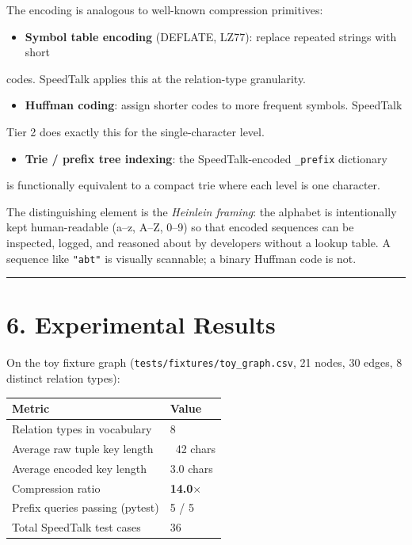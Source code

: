 The encoding is analogous to well-known compression primitives:

\begin{itemize}
  \item \textbf{Symbol table encoding} (DEFLATE, LZ77): replace repeated strings with short
\end{itemize}

codes.  SpeedTalk applies this at the relation-type granularity.
\begin{itemize}
  \item \textbf{Huffman coding}: assign shorter codes to more frequent symbols.  SpeedTalk
\end{itemize}

Tier 2 does exactly this for the single-character level.
\begin{itemize}
  \item \textbf{Trie / prefix tree indexing}: the SpeedTalk-encoded \texttt{\_prefix} dictionary
\end{itemize}

is functionally equivalent to a compact trie where each level is one character.

The distinguishing element is the \textit{Heinlein framing}: the alphabet is intentionally
kept human-readable (a--z, A--Z, 0--9) so that encoded sequences can be inspected,
logged, and reasoned about by developers without a lookup table.  A sequence like
\texttt{"abt"} is visually scannable; a binary Huffman code is not.

\medskip\noindent\rule{\linewidth}{0.4pt}\medskip

\section*{6. Experimental Results}

On the toy fixture graph (\texttt{tests/fixtures/toy\_graph.csv}, 21 nodes, 30 edges,
8 distinct relation types):

\begin{table}[h]
\small\centering
\begin{tabular}{ll}
\toprule
Metric & Value \\
\midrule
Relation types in vocabulary & 8 \\
Average raw tuple key length & ~42 chars \\
Average encoded key length & 3.0 chars \\
Compression ratio & \textbf{14.0$\times$} \\
Prefix queries passing (pytest) & 5 / 5 \\
Total SpeedTalk test cases & 36 \\
\bottomrule
\end{tabular}
\end{table}


